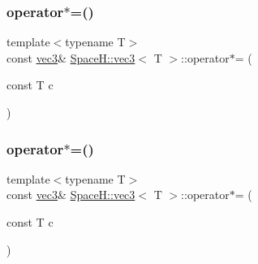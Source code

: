 \mbox{\label{struct_space_h_1_1vec3_ad4d8983185e2a69b9478c6f2baad2d36}} 
\subsubsection{\texorpdfstring{operator$\ast$=()}{operator*=()}\hspace{0.1cm}{\footnotesize\ttfamily [3/4]}}
{\footnotesize\ttfamily template$<$typename T$>$ \\
const \mbox{\hyperlink{struct_space_h_1_1vec3}{vec3}}\& \mbox{\hyperlink{struct_space_h_1_1vec3}{Space\+H\+::vec3}}$<$ T $>$\+::operator$\ast$= (\begin{DoxyParamCaption}\item[{const T}]{c }\end{DoxyParamCaption})\hspace{0.3cm}{\ttfamily [inline]}}

\mbox{\label{struct_space_h_1_1vec3_ad4d8983185e2a69b9478c6f2baad2d36}} 
\subsubsection{\texorpdfstring{operator$\ast$=()}{operator*=()}\hspace{0.1cm}{\footnotesize\ttfamily [4/4]}}
{\footnotesize\ttfamily template$<$typename T$>$ \\
const \mbox{\hyperlink{struct_space_h_1_1vec3}{vec3}}\& \mbox{\hyperlink{struct_space_h_1_1vec3}{Space\+H\+::vec3}}$<$ T $>$\+::operator$\ast$= (\begin{DoxyParamCaption}\item[{const T}]{c }\end{DoxyParamCaption})\hspace{0.3cm}{\ttfamily [inline]}}

\mbox{\label{struct_space_h_1_1vec3_a439dd37afaf3c046cd58b370b9d70b80}} 
